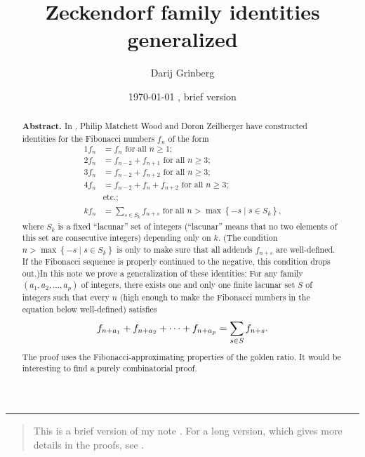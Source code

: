 \documentclass[numbers=enddot,12pt,final,onecolumn,notitlepage]{scrartcl}%
\numberwithin{exer}{section}
\theoremstyle{definition}
\newenvironment{statement}{\begin{quote}}{\end{quote}}
\let\sumnonlimits\sum
\renewcommand{\sum}{\sumnonlimits\limits}
\begin{document}
\title{Zeckendorf family identities generalized}
\author{Darij Grinberg}
\date{
\today
, brief version}
\maketitle

\begin{abstract}
\textbf{Abstract.} In \cite{1}, Philip Matchett Wood and Doron Zeilberger have
constructed identities for the Fibonacci numbers $f_{n}$ of the form%
\begin{align*}
1f_{n}  &  =f_{n}\text{ for all }n\geq1;\\
2f_{n}  &  =f_{n-2}+f_{n+1}\text{ for all }n\geq3;\\
3f_{n}  &  =f_{n-2}+f_{n+2}\text{ for all }n\geq3;\\
4f_{n}  &  =f_{n-2}+f_{n}+f_{n+2}\text{ for all }n\geq3;\\
&  \text{etc.;}\\
kf_{n}  &  =\sum_{s\in S_{k}}f_{n+s}\text{ for all }n>\max\left\{  -s\mid s\in
S_{k}\right\}  \text{,}%
\end{align*}
where $S_{k}$ is a fixed ``lacunar'' set of integers (``lacunar'' means that
no two elements of this set are consecutive integers) depending only on $k$.
(The condition $n>\max\left\{  -s\mid s\in S_{k}\right\}  $ is only to make
sure that all addends $f_{n+s}$ are well-defined. If the Fibonacci sequence is
properly continued to the negative, this condition drops out.)\newline In this
note we prove a generalization of these identities: For any family $\left(
a_{1},a_{2},\ldots,a_{p}\right)  $ of integers, there exists one and only one
finite lacunar set $S$ of integers such that every $n$ (high enough to make
the Fibonacci numbers in the equation below well-defined) satisfies
\[
f_{n+a_{1}}+f_{n+a_{2}}+\cdots+f_{n+a_{p}}=\sum\limits_{s\in S}f_{n+s}.
\]
The proof uses the Fibonacci-approximating properties of the golden ratio. It
would be interesting to find a purely combinatorial proof.

\end{abstract}



\hrule


\begin{statement}
This is a brief version of my note \cite{this.long}. For a long version, which
gives more details in the proofs, see \cite{this.long}.
\end{statement}
\end{document}

